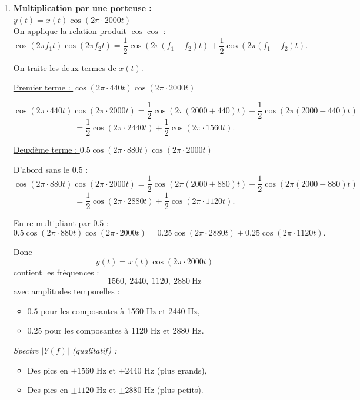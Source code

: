 \begin{enumerate}[label=(\alph*)]
Chaque pic fréquentiel représente donc une sinusoïde présente dans le son, avec :
\begin{itemize}
    \item Sa \textbf{fréquence} (hauteur),
    \item Son \textbf{amplitude} (intensité / poids dans le timbre). \\
\end{itemize} 

\item \textbf{Multiplication par une porteuse :} \\
$y(t) = x(t)\cos(2\pi \cdot 2000 t)$ \\

On applique la relation produit $\cos\cos$ :
\[
\cos(2\pi f_1 t)\cos(2\pi f_2 t)
= \frac{1}{2}\cos(2\pi(f_1+f_2)t) + \frac{1}{2}\cos(2\pi(f_1-f_2)t).
\]

On traite les deux termes de $x(t)$.

\medskip
\underline{Premier terme : $\cos(2\pi \cdot 440 t)\cos(2\pi \cdot 2000 t)$}

\[
\cos(2\pi \cdot 440 t)\cos(2\pi \cdot 2000 t)
= \frac{1}{2}\cos(2\pi(2000+440)t) + \frac{1}{2}\cos(2\pi(2000-440)t)
\]
\[
= \frac{1}{2}\cos(2\pi \cdot 2440 t) + \frac{1}{2}\cos(2\pi \cdot 1560 t).
\]

\medskip
\underline{Deuxième terme : $0.5\cos(2\pi \cdot 880 t)\cos(2\pi \cdot 2000 t)$}

D’abord sans le $0.5$ :
\[
\cos(2\pi \cdot 880 t)\cos(2\pi \cdot 2000 t)
= \frac{1}{2}\cos(2\pi(2000+880)t) + \frac{1}{2}\cos(2\pi(2000-880)t)
\]
\[
= \frac{1}{2}\cos(2\pi \cdot 2880 t) + \frac{1}{2}\cos(2\pi \cdot 1120 t).
\]

En re-multipliant par $0.5$ :
\[
0.5\cos(2\pi \cdot 880 t)\cos(2\pi \cdot 2000 t)
= 0.25\cos(2\pi \cdot 2880 t) + 0.25\cos(2\pi \cdot 1120 t).
\]

\medskip
Donc
\[
y(t) = x(t)\cos(2\pi \cdot 2000 t)
\]
contient les fréquences :
\[
1560,\ 2440,\ 1120,\ 2880\ \text{Hz}
\]
avec amplitudes temporelles :
\begin{itemize}
    \item $0.5$ pour les composantes à 1560 Hz et 2440 Hz,
    \item $0.25$ pour les composantes à 1120 Hz et 2880 Hz. \\
\end{itemize}

\textit{Spectre $|Y(f)|$ (qualitatif) :}
\begin{itemize}
    \item Des pics en $\pm 1560$ Hz et $\pm 2440$ Hz (plus grands),
    \item Des pics en $\pm 1120$ Hz et $\pm 2880$ Hz (plus petits). \\
\end{itemize}


\end{enumerate}
